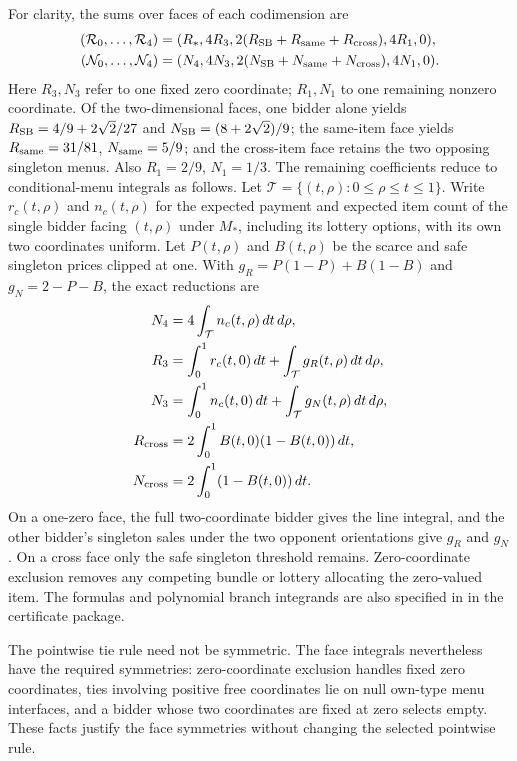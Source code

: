 For clarity, the sums over faces of each codimension are
\[
\begin{split}
 (\mathcal R_0,\ldots,\mathcal R_4)
   &=(R_*,4R_3,2(R_{\rm SB}+R_{\rm same}+R_{\rm cross}),4R_1,0),\\
 (\mathcal N_0,\ldots,\mathcal N_4)
   &=(N_4,4N_3,2(N_{\rm SB}+N_{\rm same}+N_{\rm cross}),4N_1,0).
\end{split}
\]
Here $R_3,N_3$ refer to one fixed zero coordinate; $R_1,N_1$ to one
remaining nonzero coordinate. Of the two-dimensional faces, one bidder
alone yields $R_{\rm SB}=4/9+2\sqrt2/27$ and
$N_{\rm SB}=(8+2\sqrt2)/9$; the same-item face yields
$R_{\rm same}=31/81$, $N_{\rm same}=5/9$; and the cross-item face
retains the two opposing singleton menus. Also $R_1=2/9$, $N_1=1/3$.
The remaining coefficients reduce to conditional-menu integrals as follows.
Let $\mathcal T=\{(t,\rho):0\le\rho\le t\le1\}$. Write
$r_c(t,\rho)$ and $n_c(t,\rho)$ for the expected payment and expected
item count of the single bidder facing $(t,\rho)$ under $M_*$, including
its lottery options, with its own two coordinates uniform. Let $P(t,\rho)$
and $B(t,\rho)$ be the scarce and safe singleton prices clipped at one.
With $g_R=P(1-P)+B(1-B)$ and $g_N=2-P-B$, the exact reductions are
\begin{equation}\label{eq:v5-face-reductions}
\begin{aligned}
 N_4&=4\int_{\mathcal T}n_c(t,\rho)\,dt\,d\rho,\\
 R_3&=\int_0^1r_c(t,0)\,dt+\int_{\mathcal T}g_R(t,\rho)\,dt\,d\rho,\\
 N_3&=\int_0^1n_c(t,0)\,dt+\int_{\mathcal T}g_N(t,\rho)\,dt\,d\rho,\\
 R_{\rm cross}&=2\int_0^1 B(t,0)(1-B(t,0))\,dt,\\
 N_{\rm cross}&=2\int_0^1(1-B(t,0))\,dt.
\end{aligned}
\end{equation}
On a one-zero face, the full two-coordinate bidder gives the line
integral, and the other bidder's singleton sales under the two opponent
orientations give $g_R$ and $g_N$. On a cross face only the safe singleton
threshold remains. Zero-coordinate exclusion removes any competing bundle
or lottery allocating the zero-valued item. The formulas and polynomial
branch integrands are also specified in
 in the certificate package.

The pointwise tie rule need not be symmetric. The face integrals nevertheless have the required symmetries:
zero-coordinate exclusion handles fixed zero coordinates, ties involving
positive free coordinates lie on null own-type menu interfaces, and a
bidder whose two coordinates are fixed at zero selects empty. These facts
justify the face symmetries without changing the selected pointwise rule.

